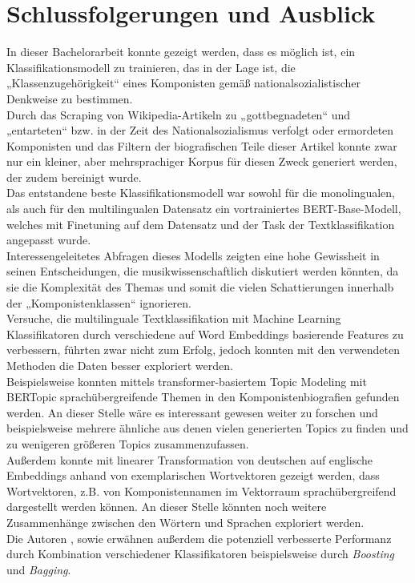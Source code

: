 \documentclass[ngerman]{ttlab-qualify}
\begin{document}
\chapter{Schlussfolgerungen und Ausblick} \label{Schluss}
In dieser Bachelorarbeit konnte gezeigt werden, dass es möglich ist, ein Klassifikationsmodell zu trainieren, das in der Lage ist, die „Klassenzugehörigkeit“ eines Komponisten gemäß nationalsozialistischer Denkweise zu bestimmen.\\
Durch das Scraping von Wikipedia-Artikeln zu „gottbegnadeten“ und „entarteten“ bzw. in der Zeit des Nationalsozialismus verfolgt oder ermordeten Komponisten und das Filtern der biografischen Teile dieser Artikel konnte zwar nur ein kleiner, aber mehrsprachiger Korpus für diesen Zweck generiert werden, der zudem bereinigt wurde. \\
Das entstandene beste Klassifikationsmodell war sowohl für die monolingualen, als auch für den multilingualen Datensatz ein vortrainiertes BERT-Base-Modell, welches mit Finetuning auf dem Datensatz und der Task der Textklassifikation angepasst wurde.\\
Interessengeleitetes Abfragen dieses Modells zeigten eine hohe Gewissheit in seinen Entscheidungen, die musikwissenschaftlich diskutiert werden könnten, da sie die Komplexität des Themas und somit die vielen Schattierungen innerhalb der „Komponistenklassen“ ignorieren.\\
Versuche, die multilinguale Textklassifikation mit Machine Learning Klassifikatoren durch verschiedene auf Word Embeddings basierende Features zu verbessern, führten zwar nicht zum Erfolg, jedoch konnten mit den verwendeten Methoden die Daten besser exploriert werden.\\
Beispielsweise konnten mittels transformer-basiertem Topic Modeling mit BERTopic sprachübergreifende Themen in den Komponistenbiografien gefunden werden. An dieser Stelle wäre es interessant gewesen weiter zu forschen und beispielsweise mehrere ähnliche aus denen vielen generierten Topics zu finden und zu wenigeren größeren Topics zusammenzufassen.\\
Außerdem konnte mit linearer Transformation von deutschen auf englische Embeddings anhand von exemplarischen Wortvektoren gezeigt werden, dass Wortvektoren, z.B. von Komponistennamen im Vektorraum sprachübergreifend dargestellt werden können. An dieser Stelle könnten noch weitere Zusammenhänge zwischen den Wörtern und Sprachen exploriert werden.\\
Die Autoren \textcite{Kowsari_2019}, sowie \textcite{ikonomakis} erwähnen außerdem die potenziell verbesserte Performanz durch Kombination verschiedener Klassifikatoren beispielsweise durch \textit{Boosting} und \textit{Bagging}.
\end{document}
